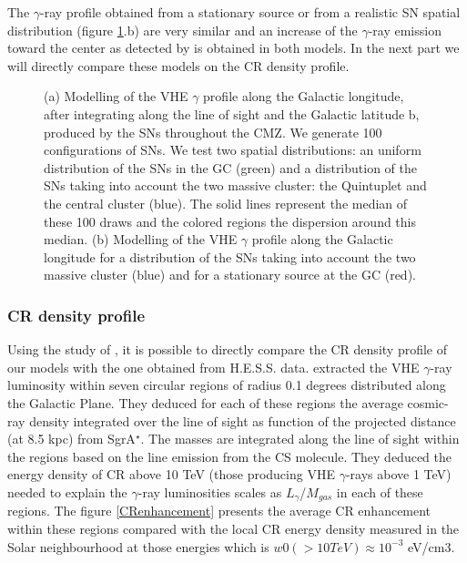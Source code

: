 \documentclass[a4paper,fleqn,usenatbib]{mnras}
\begin{document}
The $\gamma$-ray profile obtained from a stationary source or from a realistic SN spatial distribution (figure \ref{profile}.b) are very similar and an increase of the $\gamma$-ray emission toward the center as detected by \citet{2016Natur.531..476H} is obtained in both models. In the next part we will directly compare these models on the CR density profile.

%
\begin{figure}
\centering
{}
\caption{(a) Modelling of the VHE $\gamma$ profile along the Galactic longitude, after integrating along the line of sight and the Galactic latitude b, produced by the SNs throughout the CMZ. We generate 100 configurations of SNs. We test two spatial distributions: an uniform distribution of the SNs in the GC (green) and a distribution of the SNs taking into account the two massive cluster: the Quintuplet and the central cluster (blue). The solid lines represent the median of these 100 draws and the colored regions the dispersion around this median. (b) Modelling of the VHE $\gamma$ profile along the Galactic longitude for a distribution of the SNs taking into account the two massive cluster (blue) and for a stationary source at the GC (red).}
\label{profile}
\end{figure}
%
%
\subsubsection{CR density profile}

Using the study of \citet{2016Natur.531..476H} , it is possible to directly compare the CR density profile of our models with the one obtained from H.E.S.S. data. \citet{2016Natur.531..476H} extracted the VHE $\gamma$-ray luminosity within seven circular regions of radius 0.1 degrees distributed along the Galactic Plane. They deduced for each of these regions the average cosmic-ray density integrated over the line of sight as function of the projected distance (at 8.5 kpc) from SgrA$^\star$. The masses are integrated along the line of sight within the regions based on the line emission from the CS molecule. They deduced the energy density of CR above 10 TeV (those producing VHE $\gamma$-rays above 1 TeV) needed to explain the $\gamma$-ray luminosities scales as $L_{\gamma}$/$M_{gas}$ in each of these regions. The figure \ref{CRenhancement} presents the average CR enhancement within these regions \citep{2016Natur.531..476H}  compared with the local CR energy density measured in the Solar neighbourhood at those energies which is $w0(> 10 TeV) \approx 10^{-3}$ eV/cm3.
\end{document}

